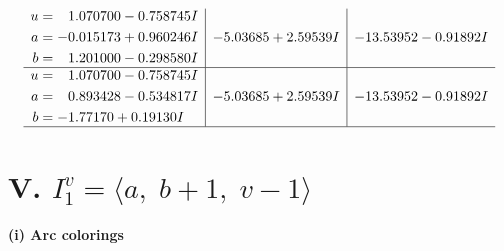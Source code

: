 \documentclass[1p]{elsarticle_modified}
\theoremstyle{definition}
\begin{document}
$$\begin{array}{c|c|c}
\begin{aligned}
u &= \phantom{-}1.070700 - 0.758745 I \\
a &= -0.015173 + 0.960246 I \\
b &= \phantom{-}1.201000 - 0.298580 I\end{aligned}
 & -5.03685 + 2.59539 I & -13.53952 - 0.91892 I \\ \hline\begin{aligned}
u &= \phantom{-}1.070700 - 0.758745 I \\
a &= \phantom{-}0.893428 - 0.534817 I \\
b &= -1.77170 + 0.19130 I\end{aligned}
 & -5.03685 + 2.59539 I & -13.53952 - 0.91892 I\\
 \hline 
 \end{array}$$\newpage\newpage\renewcommand{\arraystretch}{1}
\centering \section*{V. $I^v_{1}= \langle a,\;b+1,\;v-1 \rangle$}
\flushleft \textbf{(i) Arc colorings}\\
\end{document}
